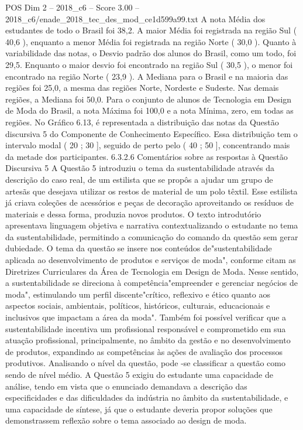 \begin{textsample}{POS Dim 2 – 2018\_c6 – Score 3.00 – 2018\_c6/enade\_2018\_tec\_des\_mod\_ce1d599a99.txt}
A nota Média dos estudantes de todo o Brasil foi 38,2.
A maior Média foi registrada na região Sul ( 40,6 ), enquanto a menor Média foi registrada na região Norte ( 30,0 ).
Quanto à variabilidade das notas, o Desvio padrão dos alunos do Brasil, como um todo, foi 29,5.
Enquanto o maior desvio foi encontrado na região Sul ( 30,5 ), o menor foi encontrado na região Norte ( 23,9 ).
A Mediana para o Brasil e na maioria das regiões foi 25,0, a mesma das regiões Norte, Nordeste e Sudeste.
Nas demais regiões, a Mediana foi 50,0.
Para o conjunto de alunos de Tecnologia em Design de Moda do Brasil, a nota Máxima foi 100,0 e a nota Mínima, zero, em todas as regiões.
No Gráfico 6.13, é representada a distribuição das notas da Questão discursiva 5 do Componente de Conhecimento Específico.
Essa distribuição tem o intervalo modal ( 20 ; 30 ], seguido de perto pelo ( 40 ; 50 ], concentrando mais da metade dos participantes. 6.3.2.6 Comentários sobre as respostas à Questão Discursiva 5 A Questão 5 introduziu o tema da sustentabilidade através da descrição do caso real, de um estilista que se propôs a ajudar um grupo de artesãs que desejava utilizar os restos de material de um polo têxtil.
Esse estilista já criava coleções de acessórios e peças de decoração aproveitando os resíduos de materiais e dessa forma, produzia novos produtos.
O texto introdutório apresentava linguagem objetiva e narrativa contextualizando o estudante no tema da sustentabilidade, permitindo a comunicação do comando da questão sem gerar dubiedade.
O tema da questão se insere nos conteúdos de"sustentabilidade aplicada ao desenvolvimento de produtos e serviços de moda", conforme citam as Diretrizes Curriculares da Área de Tecnologia em Design de Moda.
Nesse sentido, a sustentabilidade se direciona à competência"empreender e gerenciar negócios de moda", estimulando um perfil discente"crítico, reflexivo e ético quanto aos aspectos sociais, ambientais, políticos, históricos, culturais, educacionais e inclusivos que impactam a área da moda".
Também foi possível verificar que a sustentabilidade incentiva um profissional responsável e comprometido em sua atuação profissional, principalmente, no âmbito da gestão e no desenvolvimento de produtos, expandindo as competências às ações de avaliação dos processos produtivos.
Analisando o nível da questão, pode -se classificar a questão como sendo de nível médio.
A Questão 5 exigiu do estudante uma capacidade de análise, tendo em vista que o enunciado demandava a descrição das especificidades e das dificuldades da indústria no âmbito da sustentabilidade, e uma capacidade de síntese, já que o estudante deveria propor soluções que demonstrassem reflexão sobre o tema associado ao design de moda.

\end{textsample}
